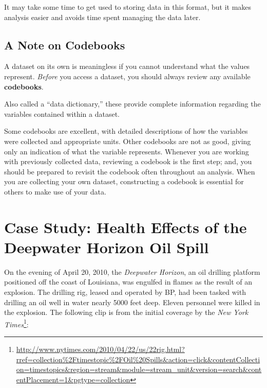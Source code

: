 \documentclass[]{book}
\let\rmarkdownfootnote\footnote%
\def\footnote{\protect\rmarkdownfootnote}
\theoremstyle{definition}
\theoremstyle{definition}
\theoremstyle{definition}
\theoremstyle{remark}
\let\BeginKnitrBlock\begin \let\EndKnitrBlock\end
\begin{document}
It may take some time to get used to storing data in this format, but it
makes analysis easier and avoids time spent managing the data later.

\section{A Note on Codebooks}\label{a-note-on-codebooks}

A dataset on its own is meaningless if you cannot understand what the
values represent. \emph{Before} you access a dataset, you should always
review any available \textbf{codebooks}.

\BeginKnitrBlock{definition}[Codebook]
\protect\hypertarget{def:defn-codebook}{}{\label{def:defn-codebook}
{} }Also called a ``data dictionary,'' these
provide complete information regarding the variables contained within a
dataset.
\EndKnitrBlock{definition}

Some codebooks are excellent, with detailed descriptions of how the
variables were collected and appropriate units. Other codebooks are not
as good, giving only an indication of what the variable represents.
Whenever you are working with previously collected data, reviewing a
codebook is the first step; and, you should be prepared to revisit the
codebook often throughout an analysis. When you are collecting your own
dataset, constructing a codebook is essential for others to make use of
your data.

\hypertarget{CaseDeepwater}{\chapter{Case Study: Health Effects of the
Deepwater Horizon Oil Spill}\label{CaseDeepwater}}

On the evening of April 20, 2010, the \emph{Deepwater Horizon}, an oil
drilling platform positioned off the coast of Louisiana, was engulfed in
flames as the result of an explosion. The drilling rig, leased and
operated by BP, had been tasked with drilling an oil well in water
nearly 5000 feet deep. Eleven personnel were killed in the explosion.
The following clip is from the initial coverage by the \emph{New York
Times}\footnote{\url{http://www.nytimes.com/2010/04/22/us/22rig.html?rref=collection\%2Ftimestopic\%2FOil\%20Spills\&action=click\&contentCollection=timestopics\&region=stream\&module=stream_unit\&version=search\&contentPlacement=1\&pgtype=collection}}:
\end{document}
